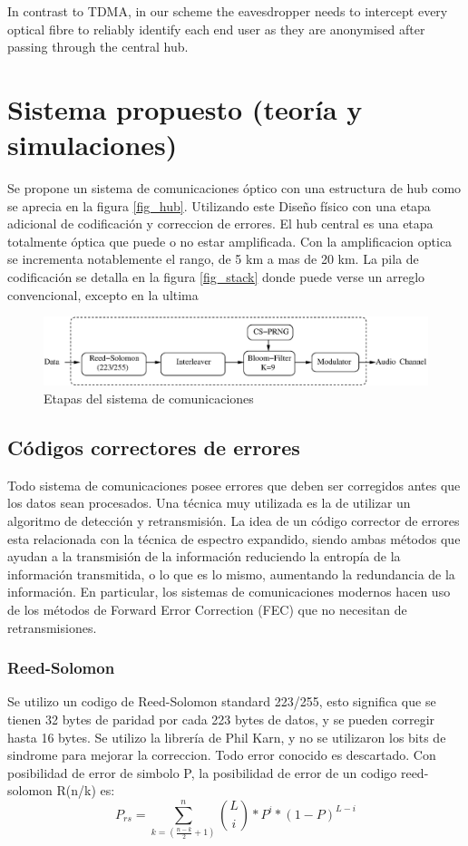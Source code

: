 \documentclass[a4paper,10pt]{report}
\begin{document}
In contrast to TDMA, in our scheme the eavesdropper needs to intercept every optical fibre to reliably identify each end user as they are anonymised after passing through the central hub.



\section{Sistema propuesto (teoría y simulaciones)}

Se propone un sistema de comunicaciones óptico con una estructura de hub como se aprecia en la figura \ref{fig_hub}. Utilizando este Diseño físico con una etapa adicional de codificación y correccion de errores. El hub central es una etapa totalmente óptica que puede o no estar amplificada. Con la amplificacion optica se incrementa notablemente el rango, de 5 km a mas de 20 km.
La pila de codificación se detalla en la figura \ref{fig_stack} donde puede verse un arreglo convencional, excepto en la ultima 

\begin{figure}[t]
\centering
\includegraphics[width=0.9 \textwidth]{Soft-stack2.eps} 
\caption{Etapas del sistema de comunicaciones}
\label{fig_comstack}
\end{figure}

\subsection{Códigos correctores de errores}

Todo sistema de comunicaciones posee errores que deben ser corregidos antes que los datos sean procesados. Una técnica muy utilizada es la de utilizar un algoritmo de detección y retransmisión.
La idea de un código corrector de errores esta relacionada con la técnica de espectro expandido, siendo ambas métodos que ayudan a la transmisión de la información reduciendo la entropía de la información transmitida, o lo que es lo mismo, aumentando la redundancia de la información. En particular, los sistemas de comunicaciones modernos hacen uso de los métodos de Forward Error Correction (FEC) que no necesitan de retransmisiones.



\subsubsection{Reed-Solomon}
Se utilizo un codigo de Reed-Solomon standard 223/255, esto significa que se tienen 32 bytes de paridad por cada 223 bytes de datos, y se pueden corregir hasta 16 bytes. Se utilizo la librería de Phil Karn, y no se utilizaron los bits de sindrome para mejorar la correccion. Todo error conocido es descartado.
Con posibilidad de error de simbolo P, la posibilidad de error de un codigo reed-solomon R(n/k) es:
$$P_{rs}= \sum_{k=(\frac{n-k}{2}+1)}^{n} \binom{L}{i} * P^{i} * (1-P)^{L-i} $$
\end{document}
